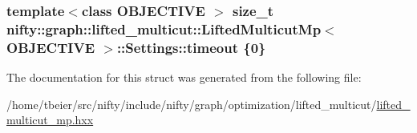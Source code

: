 \subsubsection[{timeout}]{\setlength{\rightskip}{0pt plus 5cm}template$<$class O\+B\+J\+E\+C\+T\+I\+V\+E $>$ size\+\_\+t {\bf nifty\+::graph\+::lifted\+\_\+multicut\+::\+Lifted\+Multicut\+Mp}$<$ O\+B\+J\+E\+C\+T\+I\+V\+E $>$\+::Settings\+::timeout \{0\}}\label{structnifty_1_1graph_1_1lifted__multicut_1_1LiftedMulticutMp_1_1Settings_a38b40facfd4a804b6e7934de1054f610}


The documentation for this struct was generated from the following file\+:\begin{DoxyCompactItemize}
\item 
/home/tbeier/src/nifty/include/nifty/graph/optimization/lifted\+\_\+multicut/\hyperlink{lifted__multicut__mp_8hxx}{lifted\+\_\+multicut\+\_\+mp.\+hxx}\end{DoxyCompactItemize}
